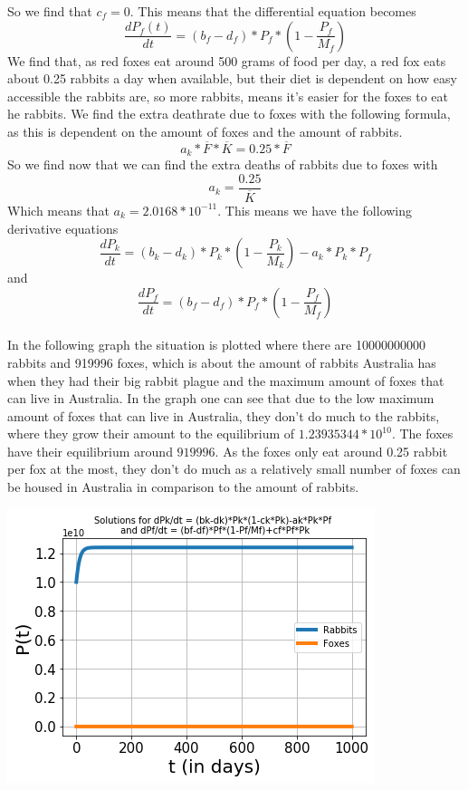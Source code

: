 \documentclass{article}
\begin{document}
So we find that $c_f=0$. This means that the differential equation becomes 
$$\frac{dP_f(t)}{dt}=(b_f-d_f)*P_f*(1-\frac{P_f}{M_f})$$
We find that, as red foxes eat around 500 grams of food per day, a red fox eats about 0.25 rabbits a day when available, but their diet is dependent on how easy accessible the rabbits are, so more rabbits, means it's easier for the foxes to eat he rabbits. We find the extra deathrate due to foxes with the following formula, as this is dependent on the amount of foxes and the amount of rabbits.
$$a_k*\overline{F}*\overline{K}=0.25*\overline{F}$$
So we find now that we can find the extra deaths of rabbits due to foxes with
$$a_k=\frac{0.25}{\overline{K}}$$
Which means that $a_k=2.0168*10^{-11}$. This means we have the following derivative equations
$$\frac{dP_k}{dt}=(b_k-d_k)*P_k*(1-\frac{P_k}{M_k})-a_k*P_k*P_f$$
and
$$\frac{dP_f}{dt}=(b_f-d_f)*P_f*(1-\frac{P_f}{M_f})$$
\\In the following graph the situation is plotted where there are 10000000000 rabbits and 919996 foxes, which is about the amount of rabbits Australia has when they had their big rabbit plague and the maximum amount of foxes that can live in Australia. In the graph one can see that due to the low maximum amount of foxes that can live in Australia, they don't do much to the rabbits, where they grow their amount to the equilibrium of $1.23935344*10^10$. The foxes have their equilibrium around $919996$. As the foxes only eat around 0.25 rabbit per fox at the most, they don't do much as a relatively small number of foxes can be housed in Australia in comparison to the amount of rabbits. 
\begin{center}
    \includegraphics[scale=0.78]{Pictures/RabbitFoxes.png}
\end{center}
\end{document}
